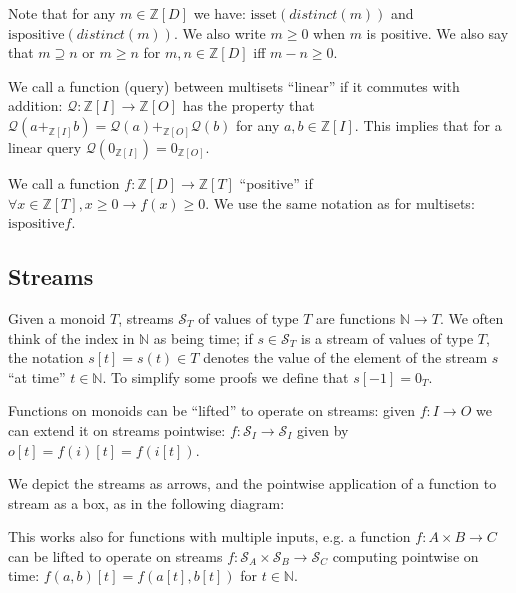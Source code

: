 \documentclass[10pt]{article}
\newcommand{\Z}{\mathbb{Z}}  %
\newcommand{\N}{\mathbb{N}}  %
\newcommand{\stream}[1]{\ensuremath{\mathcal{S}_{#1}}}
\newcommand{\distinct}{\mathit{distinct}}  %
\newcommand{\q}{\ensuremath{\mathcal{Q}}}  %
\newcommand{\isset}{\mbox{isset}}
\newcommand{\ispositive}{\mbox{ispositive}}
\begin{document}
Note that for any $m \in \Z[D]$ we have: $\isset(\distinct(m))$ and
$\ispositive(\distinct(m))$.  We also write $m \geq 0$ when $m$ is
positive.  We also say that $m \supseteq n$ or $m \geq n$ for $m, n
\in \Z[D]$ iff $m - n \geq 0$.

We call a function (query) between multisets ``linear'' if it commutes
with addition: $\q: \Z[I] \rightarrow \Z[O]$ has the property that
$\q(a +_{\Z[I]} b) = \q(a) +_{\Z[O]} \q(b)$ for any $a, b \in \Z[I]$.
This implies that for a linear query $\q(0_{\Z[I]}) = 0_{\Z[O]}$.

We call a function $f : \Z[D] \rightarrow \Z[T]$ ``positive'' if
$\forall x \in \Z[T], x \geq 0 \rightarrow f(x) \geq 0$.  We use the
same notation as for multisets: $\ispositive{f}$.

\subsection{Streams}

Given a monoid $T$, streams $\stream{T}$ of values of type $T$ are
functions $\N \rightarrow T$.  We often think of the index in $\N$ as
being time; if $s \in \stream{T}$ is a stream of values of type $T$,
the notation $s[t] = s(t) \in T$ denotes the value of the element of
the stream $s$ ``at time'' $t \in \N$.  To simplify some proofs we
define that $s[-1] = 0_T$.

Functions on monoids can be ``lifted'' to operate on streams: given
$f: I \rightarrow O$ we can extend it on streams pointwise: $f :
\stream{I} \rightarrow \stream{I}$ given by $o[t] = f(i)[t] = f(i[t])$.

We depict the streams as arrows, and the pointwise application of a
function to stream as a box, as in the following diagram:


This works also for functions with multiple inputs, e.g.  a function
$f: A \times B \rightarrow C$ can be lifted to operate on streams $f:
\stream{A} \times \stream{B} \rightarrow \stream{C}$ computing
pointwise on time: $f(a, b)[t] = f(a[t], b[t])$ for $t \in \N$.

\end{document}
